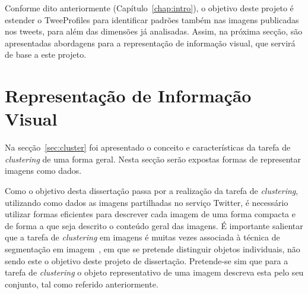 Conforme dito anteriormente (Capítulo~\ref{chap:intro}), o objetivo deste projeto é estender o TweeProfiles para identificar padrões também nas imagens publicadas nos tweets, para além das dimensões já analisadas. Assim, na próxima secção, são apresentadas abordagens para a representação de informação visual, que servirá de base a este projeto.
  



\section{Representação de Informação Visual} \label{sec:represent}

Na secção~\ref{sec:cluster} foi apresentado o conceito e características da tarefa de \textit{clustering} de uma forma geral. Nesta secção serão expostas formas de representar imagens como dados. 

Como o objetivo desta dissertação passa por a realização da tarefa de \textit{clustering}, utilizando como dados as imagens partilhadas no serviço Twitter, é necessário utilizar formas eficientes para descrever cada imagem de uma forma compacta e de forma a que seja descrito o conteúdo geral das imagens. É importante salientar que a tarefa de \textit{clustering} em imagens é muitas vezes associada à técnica de segmentação em imagem~\citet{Forsyth2011}, em que se pretende distinguir objetos individuais, não sendo este o objetivo deste projeto de dissertação. Pretende-se sim que para a tarefa de \textit{clustering} o objeto representativo de uma imagem descreva esta pelo seu conjunto, tal como referido anteriormente. 

